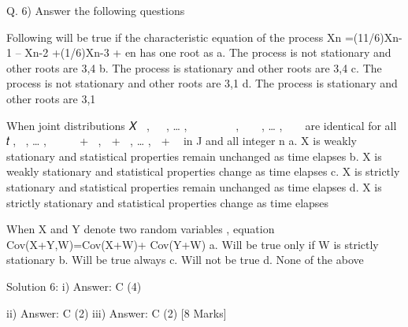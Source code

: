 Q. 6) Answer the following questions
\item Following will be true if the characteristic equation of the process
Xn =(11/6)Xn-1 – Xn-2 +(1/6)Xn-3 + en has one root as 
a. The process is not stationary and other roots are 3,4
b. The process is stationary and other roots are 3,4
c. The process is not stationary and other roots are 3,1
d. The process is stationary and other roots are 3,1

\item When joint distributions 𝑋􀯧􀰭 , 𝑋􀯧􀰮 , … , 𝑋􀯧􀳙 𝑎𝑛𝑑 𝑋􀯞􀬾􀯧􀰭 , 𝑋􀯞􀬾􀯧􀰮 , … , 𝑋􀯞􀬾􀯧􀳙 are identical for
all 𝑡􀬵, 𝑡􀬶, … , 𝑡􀯡 𝑎𝑛𝑑 𝑘 + 𝑡􀬵, 𝑘 + 𝑡􀬶, … , 𝑘 + 𝑡􀯡 in J and all integer n
a. X is weakly stationary and statistical properties remain unchanged as time elapses
b. X is weakly stationary and statistical properties change as time elapses
c. X is strictly stationary and statistical properties remain unchanged as time elapses
d. X is strictly stationary and statistical properties change as time elapses

\item When X and Y denote two random variables , equation Cov(X+Y,W)=Cov(X+W)+
Cov(Y+W)
a. Will be true only if W is strictly stationary
b. Will be true always
c. Will not be true
d. None of the above


Solution 6:
i)
Answer: C
(4)

ii)
Answer: C
(2)
iii)
Answer: C
(2)
[8 Marks]
